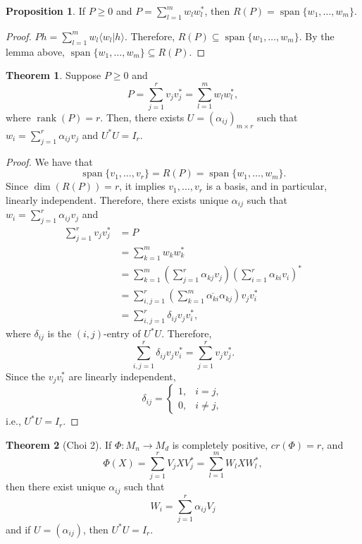 \documentclass[12pt]{article}
\theoremstyle{definition}
\newtheorem*{theorem}{Theorem}
\newtheorem*{proposition}{Proposition}
\begin{document}
\begin{proposition}
If $P \geq 0$ and $P = \sum_{l=1}^m w_lw_l^*$, then $R(P)=\operatorname{span}\{w_1,\ldots,w_m\}$.
\end{proposition}

\begin{proof}
$Ph = \sum_{l=1}^m w_l\langle w_l|h\rangle$. Therefore, $R(P) \subseteq \operatorname{span}\{w_1,\ldots,w_m\}$. By the lemma above, $\operatorname{span}\{w_1,\ldots,w_m\} \subseteq R(P)$.
\end{proof}

\begin{theorem}
Suppose $P \geq 0$ and
\[
P = \sum_{j=1}^r v_jv_j^* = \sum_{l=1}^m w_lw_l^*,
\]
where $\operatorname{rank}(P)=r$. Then, there exists $U=(\alpha_{ij})_{m\times r}$ such that $w_i = \sum_{j=1}^r \alpha_{ij}v_j$ and $U^*U = I_r$.
\end{theorem}

\begin{proof}
We have that
\[
\operatorname{span}\{v_1,\ldots,v_r\}=R(P)=\operatorname{span}\{w_1,\ldots,w_m\}.
\]
Since $\dim(R(P))=r$, it implies $v_1,\ldots,v_r$ is a basis, and in particular, linearly independent. Therefore, there exists unique $\alpha_{ij}$ such that $w_i = \sum_{j=1}^r \alpha_{ij}v_j$ and
\begin{align*}
\sum_{j=1}^r v_jv_j^* &= P \\
&= \sum_{k=1}^m w_kw_k^* \\
&= \sum_{k=1}^m \left(\sum_{j=1}^r \alpha_{kj}v_j\right)\left(\sum_{i=1}^r \alpha_{ki}v_i\right)^* \\
&= \sum_{i,j=1}^r \left(\sum_{k=1}^m \overline{\alpha_{ki}}\alpha_{kj}\right)v_jv_i^* \\
&= \sum_{i,j=1}^r \delta_{ij}v_jv_i^*,
\end{align*}
where $\delta_{ij}$ is the $(i,j)$-entry of $U^*U$. Therefore,
\[
\sum_{i,j=1}^r \delta_{ij}v_jv_i^* = \sum_{j=1}^r v_jv_j^*.
\]
Since the $v_jv_i^*$ are linearly independent,
\[
\delta_{ij} = \begin{cases}1, & i=j,\\0, & i \neq j,\end{cases}
\]
i.e., $U^*U=I_r$.
\end{proof}

\begin{theorem}[Choi 2]
If $\Phi : M_n \to M_d$ is completely positive, $cr(\Phi)=r$, and
\[
\Phi(X)=\sum_{j=1}^r V_jXV_j^* = \sum_{l=1}^m W_lXW_l^*,
\]
then there exist unique $\alpha_{ij}$ such that
\[
W_i = \sum_{j=1}^r \alpha_{ij}V_j
\]
and if $U=(\alpha_{ij})$, then $U^*U=I_r$.
\end{theorem}
\end{document}

